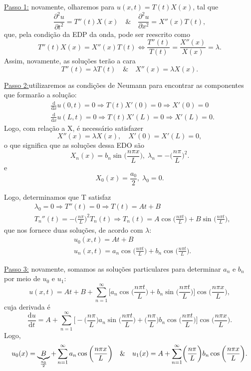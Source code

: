 \documentclass[../pde_notes.tex]{subfiles}
\begin{document}
{\color{SpringGreen4}\underline{Passo 1:}} novamente, olharemos para \(u(x, t)=T(t)X(x)\), tal que
\[
	\frac{\partial^{2}u}{\partial t^{2}} = T''(t)X(x) \quad\&\quad \frac{\partial^{2}u}{\partial x^{2}} = X''(x)T(t),
\]
que, pela condição da EDP da onda, pode ser reescrito como
\[
	T''(t)X(x) = X''(x) T(t) \Longleftrightarrow \frac{T''(t)}{T(t)} = \frac{X''(x)}{X(x)} = \lambda.
\]
Assim, novamente, as soluções terão a cara
\[
	T''(t) = \lambda T(t) \quad\&\quad X''(x) = \lambda X(x).
\]

{\color{IndianRed3}\underline{Passo 2:}}utilizaremos as condições de Neumann para encontrar as componentes que formarão a solução:
\begin{align*}
	 & \frac{\mathrm{d}}{\mathrm{d}x}u(0, t) = 0 \Rightarrow T(t)X'(0) = 0 \Rightarrow X'(0) = 0  \\
	 & \frac{\mathrm{d}}{\mathrm{d}x}u(L, t) = 0 \Rightarrow T(t)X'(L) = 0 \Rightarrow X'(L) = 0.
\end{align*}
Logo, com relação a X, é necessário satisfazer
\[
	X''(x) = \lambda X(x),\quad X'(0) = X'(L) = 0,
\]
o que significa que as soluções dessa EDO são
\[
	X_{n}(x) = b_{n}\sin^{}{\biggl(\frac{n\pi x}{L}\biggr)},\; \lambda_{n} = -\biggl(\frac{n\pi }{L}\biggr)^{2}.
\]
e
\[
	X_{0}(x) = \frac{a_{0}}{2},\; \lambda_{0} =0.
\]

Logo, determinamos que T satisfaz
\begin{align*}
	 & \lambda_{0} = 0 \Rightarrow T''(t) = 0 \Rightarrow T(t) = At + B                                                                                                     \\
	 & T_{n}''(t) = -\biggl(\frac{n\pi }{L}\biggr)^{2}T_{n}(t) \Rightarrow T_{n}(t) = A\cos^{}{\biggl(\frac{n\pi t}{L}\biggr)} + B \sin^{}{\biggl(\frac{n\pi t}{L}\biggr)},
\end{align*}
que nos fornece duas soluções, de acordo com \(\lambda \):
\begin{align*}
	 & u_{0}(x, t) = At + B                                                                                        \\
	 & u_{n}(x, t) = a_{n}\cos^{}{\biggl(\frac{n\pi t}{L}\biggr)} + b_{n} \cos^{}{\biggl(\frac{n\pi t}{L}\biggr)}.
\end{align*}

{\color{RoyalBlue3}\underline{Passo 3:}} novamente, somamos as soluções particulares para determinar \(a_{n}\) e \(b_{n}\) por meio de \(u_{0}\) e \(u_{1}\):
\[
	u(x, t) = At + B + \sum\limits_{n=1}^{\infty}\biggl[a_{n}\cos^{}{\biggl(\frac{n\pi t}{L}\biggr)} + b_{n}\sin^{}{\biggl(\frac{n\pi t}{L}\biggr)}\biggr]\cos^{}{\biggl(\frac{n\pi x}{L}\biggr)},
\]
cuja derivada é
\[
	\frac{\mathrm{d}u}{\mathrm{d}t} = A + \sum\limits_{n=1}^{\infty}\biggl[-\biggl(\frac{n\pi }{L}\biggr)a_{n}\sin^{}{\biggl(\frac{n\pi t}{L}\biggr)} + \biggl(\frac{n\pi }{L}\biggr)b_{n}\cos^{}{\biggl(\frac{n\pi t}{L}\biggr)}\biggr]\cos^{}{\biggl(\frac{n\pi x}{L}\biggr)}.
\]
Logo,
\[
	u_{0}(x) = \underbrace{B}_{\mathclap{\frac{a_{0}}{2}}} + \sum\limits_{n=1}^{\infty}a_{n}\cos^{}{\biggl(\frac{n\pi x}{L}\biggr)} \quad\&\quad u_{1}(x) = A + \sum\limits_{n=1}^{\infty}\biggl(\frac{n\pi }{L}\biggr)b_{n}\cos^{}{\biggl(\frac{n\pi x}{L}\biggr)}.
\]
\end{document}
